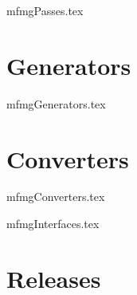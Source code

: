 \documentclass[11pt,a4paper]{report}
\begin{document}

{mfmgPasses.tex}
%
%
%
%


\part{Generators}

{mfmgGenerators.tex}


\part{Converters}

{mfmgConverters.tex}



{mfmgInterfaces.tex}

%
%
%


\part{Releases}
\end{document}
